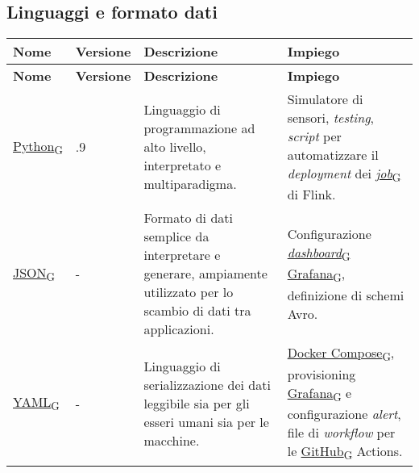 \subsection{Linguaggi e formato dati}
\begin{longtable}{|>{\centering\arraybackslash}m{}|>{\centering\arraybackslash}m{}|>{\centering\arraybackslash}m{}|>{\centering\arraybackslash}m{}|}
	\hline
	\textbf{Nome} & \textbf{Versione} & \textbf{Descrizione}                                                                                                                                 & \textbf{Impiego}                                                                                                             \\\hline
	\endfirsthead
	\hline
	\textbf{Nome} & \textbf{Versione} & \textbf{Descrizione}                                                                                                                                 & \textbf{Impiego}                                                                                                             \\\hline
	\endhead
	\href{https://7last.github.io/docs/pb/documentazione-interna/glossario\#python}{Python\textsubscript{G}}        & 3.11.9            & Linguaggio di programmazione ad alto livello, interpretato e multiparadigma.                                                                         & Simulatore di sensori, \textit{testing}, \textit{script} per automatizzare il \textit{deployment} dei \href{https://7last.github.io/docs/pb/documentazione-interna/glossario\#job}{\textit{job}\textsubscript{G}} di Flink. \\\hline
	\href{https://7last.github.io/docs/pb/documentazione-interna/glossario\#javascript-object-notation}{JSON\textsubscript{G}}          & -                 & Formato di dati semplice da interpretare e generare, ampiamente utilizzato per lo scambio di dati tra applicazioni.                                  & Configurazione \href{https://7last.github.io/docs/pb/documentazione-interna/glossario\#dashboard}{\textit{dashboard}\textsubscript{G}} \href{https://7last.github.io/docs/pb/documentazione-interna/glossario\#grafana}{Grafana\textsubscript{G}}, definizione di schemi Avro.                                                       \\\hline
	\href{https://7last.github.io/docs/pb/documentazione-interna/glossario\#yet-another-markup-language}{YAML\textsubscript{G}}          & -                 & Linguaggio di serializzazione dei dati leggibile sia per gli esseri umani sia per le macchine.                                                       & \href{https://7last.github.io/docs/pb/documentazione-interna/glossario\#docker-compose}{Docker Compose\textsubscript{G}}, provisioning \href{https://7last.github.io/docs/pb/documentazione-interna/glossario\#grafana}{Grafana\textsubscript{G}} e configurazione \textit{alert}, file di \textit{workflow} per le \href{https://7last.github.io/docs/pb/documentazione-interna/glossario\#github}{GitHub\textsubscript{G}} Actions.       \\\hline

\end{longtable}

